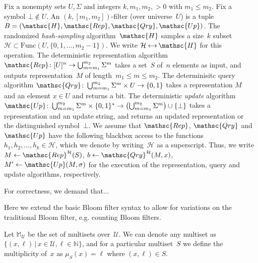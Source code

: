 Fix a nonempty sets $U,\Sigma$ and integers $k,m_1,m_2,>0$ with $m_1 \leq m_2$.  Fix a symbol $\bot \not\in U$.  An $(k,[m_1,m_2])$-filter (over universe~$U$) is a tuple  $B=(\mathsc{H},\mathsc{Rep},\mathsc{Qry},\mathsc{Up})$.   
%
The randomized \emph{hash-sampling} algorithm~$\mathsc{H}$ samples a size~$k$ subset~$\mathcal{H} \subset \mathrm{Func}(U,\{0,1,\ldots,m_2-1\})$.  We write $\mathcal{H} \getsr \mathsc{H}$ for this operation.
%
The deterministic representation algorithm $\mathsc{Rep}\colon [U]^n \rightarrow \bigcup_{m=m_1}^{m_2}\Sigma^m$ takes a set~$S$ of~$n$ elements as input, and outputs representation~$M$ of length~$m_1 \leq m \leq m_2$.
%
The determinisitc query algorithm $\mathsc{Qry}\colon \bigcup_{m=m_1}^{m_2}\Sigma^m \times U \rightarrow \bits$ takes a representation $M$ and an element $x \in U$ and returns a bit.  
%
The deterministic \emph{update} algorithm $\mathsc{Up}\colon \bigcup_{m=m_1}^{m_2}\Sigma^m \times \bits^* \rightarrow \left(\bigcup_{m=m_1}^{m_2}\Sigma^m \right) \cup \{\bot\}$ takes a representation and an update string, and returns an updated representation or the distinguished symbol~$\bot$. 
%
%
We assume that $\mathsc{Rep}$, $\mathsc{Qry}$ and $\mathsc{Up}$ have the following blackbox access to the functions $h_1,h_2,\ldots,h_k \in \mathcal{H}$, which we denote by writing~$\mathcal{H}$ as a superscript.   Thus, we write $M \gets \mathsc{Rep}^{\mathcal{H}}(S)$, $b \gets \mathsc{Qry}^{\mathcal{H}}(M,x)$, $M' \gets \mathsc{Up}(M,\sigma)$ for the execution of the representation, query and update algorithms, respectively.

For correctness, we demand that... 





Here we extend the basic Bloom filter syntax to allow for variations on the traditional Bloom filter, e.g. counting Bloom filters.  

Let $\mathbb{M}_\mathcal{U}$ be the set of multisets over~$\mathcal{U}$.  We can denote any multiset as $\{(x,\ell) \,|\, x \in \mathcal{U}, \ell \in \mathbb{N}\}$, and for a particular multiset~$S$ we define the multiplicity of~$x$ as $\mu_S(x) = \ell$ where $(x,\ell)\in S$.

